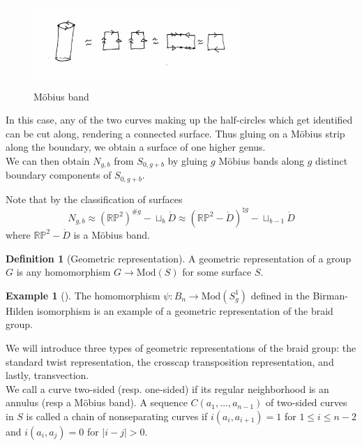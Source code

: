 \documentclass[reqno]{amsart}
\theoremstyle{definition}
\newtheorem{definition}[theorem]{Definition}
\newtheorem{example}[theorem]{Example}
\theoremstyle{remark}
\newcommand{\Mod}{{\mathrm{Mod}}}
\begin{document}
\begin{figure}[htpb]
    \centering
    \includegraphics[width=0.7\textwidth]{mapping-cylinder-mobius.jpg}
    \label{fig:mapping-cylinder-mobius}
    \caption{Möbius band}
\end{figure}

In this case, any of the two curves making up the half-circles which
get identified can be cut along, rendering a connected surface.
Thus gluing on a Möbius strip along the boundary, we obtain a
surface of one higher genus.\\


We can then obtain $N_{g,b}$ from $S_{0,g+b}$ by
gluing $g$ Möbius bands along $g$ distinct boundary
components of $S_{0,g+b}$.

Note that by the classification of surfaces
\[
N_{g,b} \approx \left( \mathbb{R}\mathbb{P}^2 \right)^{\# g} -
\sqcup_{b} \mathring{D} \approx 
 \left(\mathbb{R}\mathbb{P}^2 - \mathring{D} 
\right)^{\natural g} - \sqcup_{b-1} \mathring{D}
\] 
where $\mathbb{R}\mathbb{P}^2 - \mathring{D}$ is a Möbius band.


\begin{definition}[Geometric representation]
    A geometric representation of a group $G$ is any
    homomorphism $G \to \Mod (S)$ for some
    surface $S$.
\end{definition}

\begin{example}[]
    The homomorphism $\psi  \colon B_n \to \Mod(S_{g}^{1})$ 
    defined in the Birman-Hilden isomorphism is an
    example of a geometric representation of the braid group.
\end{example}


We will introduce three types of geometric representations
of the braid group: the standard twist representation, the crosscap
transposition representation, and lastly, transvection.\\


We call a curve two-sided (resp. one-sided) if its regular neighborhood is an
annulus (resp a Möbius band). A sequence
$C \left( a_1, \ldots, a_{n-1} \right) $ of two-sided
curves in $S$ is called a chain of nonseparating curves
if $i \left( a_i, a_{i+1} \right) =1$ for
$1 \le i \le n-2$ and
$i \left( a_i, a_j \right) =0$ for $\left| i-j \right| >0$.
\end{document}
